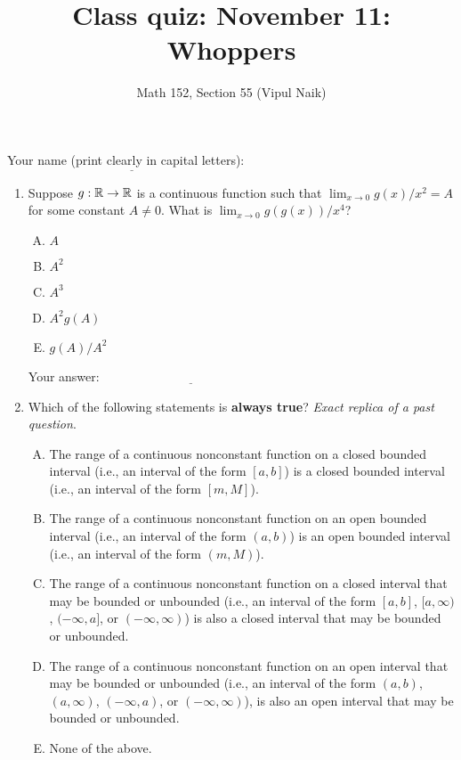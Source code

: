 \documentclass[10pt]{amsart}
\title{Class quiz: November 11: Whoppers}
\author{Math 152, Section 55 (Vipul Naik)}
\begin{document}
\maketitle

Your name (print clearly in capital letters): $\underline{\qquad\qquad\qquad\qquad\qquad\qquad\qquad\qquad\qquad\qquad}$

\begin{enumerate}
\item Suppose $g:\mathbb{R} \to \mathbb{R}$ is a continuous function such that
  $\lim_{x \to 0} g(x)/x^2 = A$ for some constant $A \ne 0$. What is
  $\lim_{x \to 0} g(g(x))/x^4$? 

  \begin{enumerate}[(A)]
  \item $A$
  \item $A^2$
  \item $A^3$
  \item $A^2g(A)$
  \item $g(A)/A^2$
  \end{enumerate}

  
  Your answer: $\underline{\qquad\qquad\qquad\qquad\qquad\qquad\qquad}$
  

\item Which of the following statements is {\bf always true}? {\em
  Exact replica of a past question}.

  \begin{enumerate}[(A)]

  \item The range of a continuous nonconstant function on a closed
    bounded interval (i.e., an interval of the form $[a,b]$) is a
    closed bounded interval (i.e., an interval of the form $[m,M]$).
  \item The range of a continuous nonconstant function on an open
    bounded interval (i.e., an interval of the form $(a,b)$) is an
    open bounded interval (i.e., an interval of the form $(m,M)$).
  \item The range of a continuous nonconstant function on a closed
    interval that may be bounded or unbounded (i.e., an interval of
    the form $[a,b]$, $[a,\infty)$, $(-\infty,a]$, or
    $(-\infty,\infty)$) is also a closed interval that may be bounded
    or unbounded.
  \item The range of a continuous nonconstant function on an open
    interval that may be bounded or unbounded (i.e., an interval of
    the form $(a,b)$,$(a,\infty)$, $(-\infty,a)$, or
    $(-\infty,\infty)$), is also an open interval that may be bounded
    or unbounded.
  \item None of the above.
  \end{enumerate}


\end{enumerate}
\end{document}
